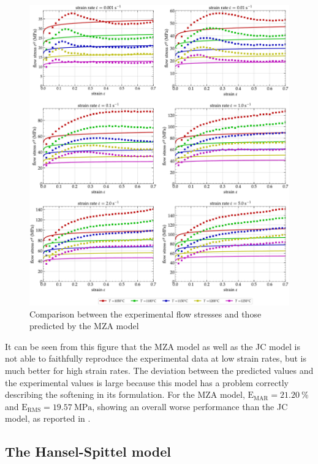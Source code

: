 \documentclass[metals,article,submit,pdftex,moreauthors]{Definitions/mdpi}
\DeclareRobustCommand{\RMSE}{\text{E}_\text{RMS}}
\DeclareRobustCommand{\MARE}{\text{E}_\text{MAR}}
\DeclareRobustCommand{\MPa}{\text{MPa}}
\begin{document}
\begin{figure}[!ht]
\centering
\includegraphics[width=\columnwidth]
{Figures/CompExp-MZA-6}
\caption{Comparison between the experimental flow stresses and those predicted by the MZA model}
\label{fig:CompExp-MZA-6}
\end{figure}
It can be seen from this figure that the MZA model as well as the JC model is not able to faithfully reproduce the experimental data at low strain rates, but is much better for high strain rates.
The deviation between the predicted values and the experimental values is large because this model has a problem correctly describing the softening in its formulation.
For the MZA model, $\MARE=21.20~\%$ and $\RMSE=19.57~\MPa$, showing an overall worse performance than the JC model, as reported in \cite{TizeMha-2022}.

\subsection{The Hansel-Spittel model\label{sec:HSmodel}}
\end{document}
